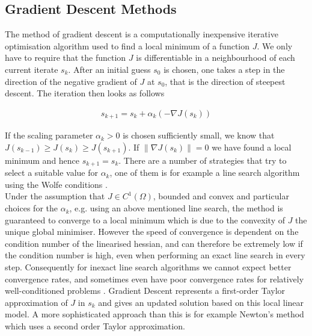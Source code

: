 \documentclass[../draft_1.tex]{subfiles}
\begin{document}
\subsection{Gradient Descent Methods}
The method of gradient descent is a computationally inexpensive iterative optimisation algorithm used to find a local minimum of a function $J$. We only have to require that the function $J$ is differentiable in a neighbourhood of each current iterate $s_k$. After an initial guess $s_0$ is chosen, one takes a step in the direction of the negative gradient of $J$ at $s_0$, that is the direction of steepest descent. The iteration then looks as follows 
\begin{ceqn}
	\begin{align}
	s_{k+1} = s_k + \alpha_k (- \nabla J(s_k))
	\end{align}
\end{ceqn}
If the scaling parameter $\alpha_k > 0 $ is chosen sufficiently small, we know that $J(s_{k-1}) \geq J(s_{k})  \geq J(s_{k+1})$. If $ \| \nabla J(s_k) \| = 0$ we have found a local minimum and hence $s_{k+1} = s_k$. There are a number of strategies that try to select a suitable value for $\alpha_k$, one of them is for example a line search algorithm using the Wolfe conditions \cite{NoceWrig99}.
\smallskip
\\
Under the assumption that $J \in C^1(\Omega)$, bounded and convex and particular choices for the $\alpha_k$, e.g. using an above mentioned line search, the method is guaranteed to converge to a local minimum which is due to the convexity of $J$ the unique global minimiser. However the speed of convergence is dependent on the condition number of the linearised hessian, and can therefore be extremely low if the condition number is high, even when performing an exact line search in every step. Consequently for inexact line search algorithms we cannot expect better convergence rates, and sometimes even have poor convergence rates for relatively well-conditioned problems \cite{NoceWrig99}. Gradient Descent represents a first-order Taylor approximation of $J$ in $s_k$ and gives an updated solution based on this local linear model. A more sophisticated approach than this is for example Newton's method which uses a second order Taylor approximation. 
\end{document}
